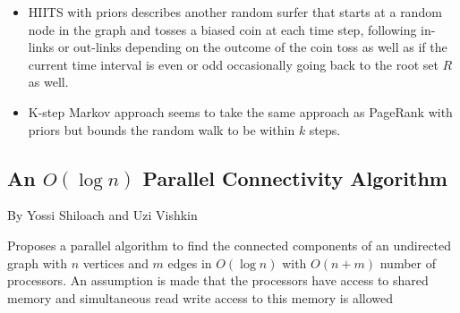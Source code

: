 \documentclass[a4paper]{article}
\begin{document}
\begin{itemize}
\begin{itemize}
\item HIITS with priors describes another random surfer that starts at a random node in the graph and tosses a biased coin at each time step, following in-links or out-links depending on the outcome of the coin toss as well as if the current time interval is even or odd occasionally going back to the root set $R$ as well.

\item K-step Markov approach seems to take the same approach as PageRank with priors but bounds the random walk to be within $k$ steps.

\end{itemize}
\end{itemize}


\subsection{An $O(\log n)$ Parallel Connectivity Algorithm}

By Yossi Shiloach and Uzi Vishkin

Proposes a parallel algorithm to find the connected components of an undirected graph with $n$ vertices and $m$ edges in $O(\log n)$ with $O(n + m)$ number of processors. An assumption is made that the processors have access to shared memory and simultaneous read write access to this memory is allowed
\end{document}
